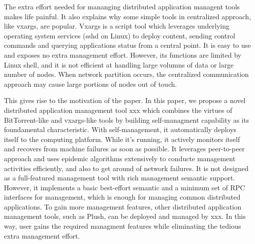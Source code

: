 \documentclass[10pt, twocolumn]{article}
\begin{document}
\iffalse
The situation is similar for the
centralized management tools. The central controller and every
clients have to be deployed and managed.  Some centralized tools
make use of services provided by operating systems as
clients---e.g. sshd of *nix systems---and avoid the deployment
and management of these services but the management functions
are limited.  It is a choice to use management services that are
already deployed and maintained by others, which kicks the ball
back to the operators of the services. 
\fi

The extra effort needed for mananging distributed application
managent tools makes life painful. It also explains why some
simple tools in centralized approach, like vxargs, are popular.
Vxargs is a script tool which leverages underlying operating
system services (sshd on Linux) to deploy content, sending
control commands and querying applications status from a central
point. It is easy to use and exposes no extra management effort.
However, its functions are limited by Linux shell, and it is not
efficient at handling large volumns of data or large number of
nodes. When network partition occurs, the centralized
communication approach may cause large portions of nodes out of
touch.

This gives rise to the motivation of the paper. In this paper,
we propose a novel distributed application management tool xxx which
combines the virtues of BitTorrent-like and vxargs-like tools by
building self-managment capability as its foundamental
characteristic.  With self-management, it automatically deploys
itself to the computing platform. While it's running, it
actively monitors itself and recovers from machine failures as
soon as possible.  It leverages peer-to-peer approach and uses
epidemic algorithms extensively to conducte management
activities efficiently, and also to get around of network
failures. It is not designed as a full-featured management tool
with rich management semantic support. However, it implements a
basic best-effort semantic and a minimum set of RPC interfaces
for management, which is enough for managing common distributed
applications. To gain more management features, other
distributed application management tools, such as Plush, can be
deployed and managed by xxx. In this way, user gains the
required managment features while eliminating the tedious extra
management effort.

\iffalse
The challenges:

1. moderate authentication and encryption mechanism is need to
protecting user credentials. It is used at `login' step of
self deployment. The mechanism is also needed to prevent
un-authorized users to use xxx.

2. 
\fi



 
\end{document}
